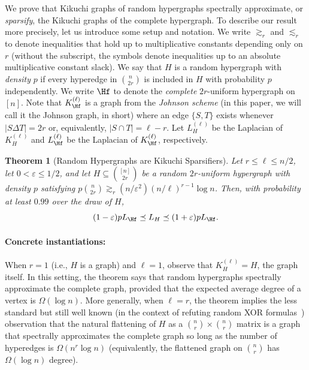\documentclass
[11pt,letterpaper]
{article}
\renewcommand{\epsilon}{\varepsilon}
\newtheorem{theorem}{Theorem}[section]
\begin{document}
We prove that Kikuchi graphs of random hypergraphs spectrally approximate, or \emph{sparsify}, the Kikuchi graphs of the complete hypergraph. To describe our result more precisely, let us introduce some setup and notation. We write $\gtrsim_r$ and $\lesssim_r$ to denote inequalities that hold up to multiplicative constants depending only on $r$ (without the subscript, the symbols denote inequalities up to an absolute multiplicative constant slack). We say that $H$ is a random hypergraph with \emph{density} $p$ if every hyperedge in ${n \choose 2r}$ is included in $H$ with probability $p$ independently. We write $\Hf$ to denote the \emph{complete} $2r$-uniform hypergraph on $[n]$. Note that $K^{(\ell)}_{\Hf}$ is a graph from the \emph{Johnson scheme} (in this paper, we will call it the Johnson graph, in short) where an edge $\{S,T\}$ exists whenever $|S \Delta T| = 2r$ or, equivalently, $|S \cap T| = \ell - r$. Let $L_H^{(\ell)}$ be the Laplacian of $K^{(\ell)}_H$ and $L_{\Hf}^{(\ell)}$ be the Laplacian of $K^{(\ell)}_{\Hf}$, respectively. 
 

\begin{theorem}[Random Hypergraphs are Kikuchi Sparsifiers] \label{thm:main}
Let $r \leq \ell \leq n/2$, let $0<\epsilon\leq 1/2$, and let $H \subseteq {[n] \choose 2r}$ be a random $2r$-uniform hypergraph with density $p$ satisfying $p {n \choose 2r} \gtrsim_{r} (n/\epsilon^2) (n/\ell)^{r-1} \log n$. Then, with probability at least $0.99$ over the draw of $H$, 
\[
(1-\epsilon) p L_{\Hf} \preceq L_{H} \preceq (1+\epsilon) p L_{\Hf}.
\]
\end{theorem}


\paragraph{Concrete instantiations:} 
When $r = 1$ (i.e., $H$ is a graph) and $\ell = 1$, observe that $K^{(\ell)}_H = H$, the graph itself. In this setting, the theorem says that random hypergraphs spectrally approximate the complete graph, provided that the expected average degree of a vertex is $\Omega(\log n)$.  More generally, when $\ell =r$, the theorem implies the less standard but still well known (in the context of refuting random XOR formulas~\cite{CojaGL07,GoerdtKrivelevich01}) observation that the natural flattening of $H$ as a ${n \choose r}\times {n \choose r}$ matrix is a graph that spectrally approximates the complete graph so long as the number of hyperedges is $\Omega(n^r \log n)$ (equivalently, the flattened graph on ${n \choose r}$ has $\Omega(\log n)$ degree). 
\end{document}
